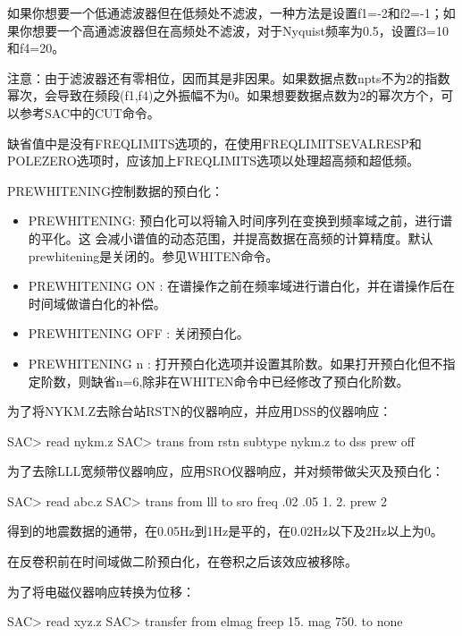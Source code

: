 如果你想要一个低通滤波器但在低频处不滤波，一种方法是设置f1=-2和f2=-1；如果你想要一个高通滤波器但在高频处不滤波，对于Nyquist频率为0.5，设置f3=10和f4=20。

注意：由于滤波器还有零相位，因而其是非因果。如果数据点数npts不为2的指数幂次，会导致在频段(f1,f4)之外振幅不为0。如果想要数据点数为2的幂次方个，可以参考SAC中的CUT命令。

缺省值中是没有FREQLIMITS选项的，在使用FREQLIMITSEVALRESP和POLEZERO选项时，应该加上FREQLIMITS选项以处理超高频和超低频。

PREWHITENING控制数据的预白化：
\begin{itemize}
\item PREWHITENING: 预白化可以将输入时间序列在变换到频率域之前，进行谱的平化。这	会减小谱值的动态范围，并提高数据在高频的计算精度。默认prewhitening是关闭的。参见WHITEN命令。
\item PREWHITENING ON : 在谱操作之前在频率域进行谱白化，并在谱操作后在时间域做谱白化的补偿。
\item PREWHITENING OFF : 关闭预白化。
\item PREWHITENING n : 打开预白化选项并设置其阶数。如果打开预白化但不指定阶数，则缺省n=6,除非在WHITEN命令中已经修改了预白化阶数。
\end{itemize}

为了将NYKM.Z去除台站RSTN的仪器响应，并应用DSS的仪器响应：
\begin{SACCode}
SAC> read nykm.z
SAC> trans from rstn subtype nykm.z to dss prew off
\end{SACCode}

为了去除LLL宽频带仪器响应，应用SRO仪器响应，并对频带做尖灭及预白化：
\begin{SACCode}
SAC> read abc.z
SAC> trans from lll to sro freq .02 .05 1. 2. prew 2
\end{SACCode}
得到的地震数据的通带，在0.05Hz到1Hz是平的，在0.02Hz以下及2Hz以上为0。

在反卷积前在时间域做二阶预白化，在卷积之后该效应被移除。

为了将电磁仪器响应转换为位移：
\begin{SACCode}
SAC>  read xyz.z
SAC>  transfer from elmag freep 15. mag 750. to none
\end{SACCode}
